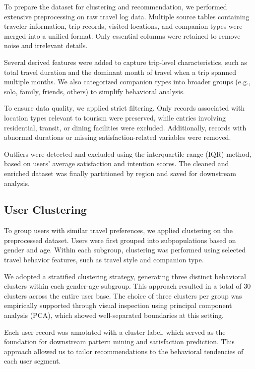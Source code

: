 \documentclass[sigconf]{acmart}
\begin{document}
To prepare the dataset for clustering and recommendation, we performed extensive preprocessing on raw travel log data. Multiple source tables containing traveler information, trip records, visited locations, and companion types were merged into a unified format. Only essential columns were retained to remove noise and irrelevant details.

Several derived features were added to capture trip-level characteristics, such as total travel duration and the dominant month of travel when a trip spanned multiple months. We also categorized companion types into broader groups (e.g., solo, family, friends, others) to simplify behavioral analysis.

To ensure data quality, we applied strict filtering. Only records associated with location types relevant to tourism were preserved, while entries involving residential, transit, or dining facilities were excluded. Additionally, records with abnormal durations or missing satisfaction-related variables were removed.

Outliers were detected and excluded using the interquartile range (IQR) method, based on users’ average satisfaction and intention scores. The cleaned and enriched dataset was finally partitioned by region and saved for downstream analysis.


\subsection{User Clustering}

To group users with similar travel preferences, we applied clustering on the preprocessed dataset. Users were first grouped into subpopulations based on gender and age. Within each subgroup, clustering was performed using selected travel behavior features, such as travel style and companion type.

We adopted a stratified clustering strategy, generating three distinct behavioral clusters within each gender-age subgroup. This approach resulted in a total of 30 clusters across the entire user base. The choice of three clusters per group was empirically supported through visual inspection using principal component analysis (PCA), which showed well-separated boundaries at this setting.

Each user record was annotated with a cluster label, which served as the foundation for downstream pattern mining and satisfaction prediction. This approach allowed us to tailor recommendations to the behavioral tendencies of each user segment.
\end{document}
